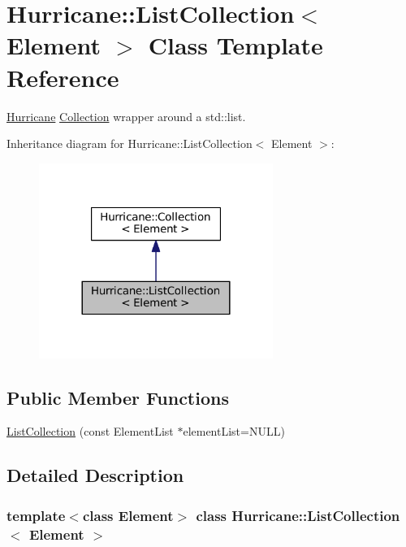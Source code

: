 \hypertarget{classHurricane_1_1ListCollection}{}\section{Hurricane\+:\+:List\+Collection$<$ Element $>$ Class Template Reference}
\label{classHurricane_1_1ListCollection}


\mbox{\hyperlink{namespaceHurricane}{Hurricane}} \mbox{\hyperlink{classHurricane_1_1Collection}{Collection}} wrapper around a std\+::list.  




Inheritance diagram for Hurricane\+:\+:List\+Collection$<$ Element $>$\+:\nopagebreak
\begin{figure}[H]
\begin{center}
\leavevmode
\includegraphics[width=216pt]{classHurricane_1_1ListCollection__inherit__graph}
\end{center}
\end{figure}
\subsection*{Public Member Functions}
\begin{DoxyCompactItemize}
\item 
\mbox{\hyperlink{classHurricane_1_1ListCollection_a11d0b27c9b01f16fe9ac9da091575e7c}{List\+Collection}} (const Element\+List $\ast$element\+List=N\+U\+LL)
\end{DoxyCompactItemize}


\subsection{Detailed Description}
\subsubsection*{template$<$class Element$>$\newline
class Hurricane\+::\+List\+Collection$<$ Element $>$}

